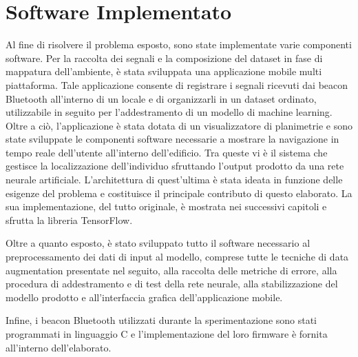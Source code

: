 \documentclass[draft]{standalone}
\begin{document}
\section{Software Implementato}
Al fine di risolvere il problema esposto, sono state implementate varie
componenti software. Per la raccolta dei segnali e la composizione del dataset
in fase di mappatura dell'ambiente, è stata sviluppata una applicazione mobile
multi piattaforma. Tale applicazione consente di registrare i segnali ricevuti
dai beacon Bluetooth all'interno di un locale e di organizzarli in un dataset
ordinato, utilizzabile in seguito per l'addestramento di un modello di machine
learning. Oltre a ciò, l'applicazione è stata dotata di un visualizzatore di
planimetrie e sono state sviluppate le componenti software necessarie a
mostrare la navigazione in tempo reale dell'utente all'interno dell'edificio.
Tra queste vi è il sistema che gestisce la localizzazione dell'individuo
sfruttando l'output prodotto da una rete neurale artificiale. L'architettura
di quest'ultima è stata ideata in funzione delle esigenze del problema e
costituisce il principale contributo di questo elaborato. La sua
implementazione, del tutto originale, è mostrata nei successivi capitoli e
sfrutta la libreria TensorFlow.

Oltre a quanto esposto, è stato sviluppato tutto il software necessario al
preprocessamento dei dati di input al modello, comprese tutte le tecniche di
data augmentation presentate nel seguito, alla raccolta delle metriche di
errore, alla procedura di addestramento e di test della rete neurale, alla
stabilizzazione del modello prodotto e all'interfaccia grafica
dell'applicazione mobile.

Infine, i beacon Bluetooth utilizzati durante la sperimentazione sono stati
programmati in linguaggio C e l'implementazione del loro firmware è fornita
all'interno dell'elaborato.

\end{document}
